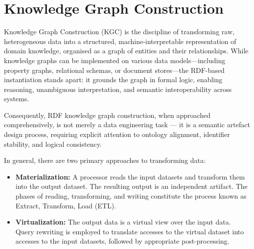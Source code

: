 \chapter{Knowledge Graph Construction}
Knowledge Graph Construction (KGC) is the discipline of transforming raw, heterogeneous data into a structured,
machine-interpretable representation of domain knowledge, organised as a graph of entities and their relationships.
While knowledge graphs can be implemented on various data models—including property graphs,
relational schemas, or document stores—the RDF-based instantiation stands apart:
it grounds the graph in formal logic, enabling reasoning, unambiguous interpretation, and semantic interoperability across systems.

Consequently, RDF knowledge graph construction, when approached comprehensively, is not merely a data engineering task — it is a semantic artefact design process,
requiring explicit attention to ontology alignment, identifier stability, and logical consistency.


In general, there are two primary approaches to transforming data:
\begin{itemize}
  \item \textbf{Materialization:} A processor reads the input datasets and transform them into the output dataset.
  The resulting output is an independent artifact. The phases of reading, transforming, and writing constitute the process known as Extract, Transform, Load (ETL).
  \item \textbf{Virtualization:} The output data is a virtual view over the input data.
  Query rewriting is employed to translate accesses to the virtual dataset into accesses to the input datasets, followed by appropriate post-processing.
\end{itemize}

